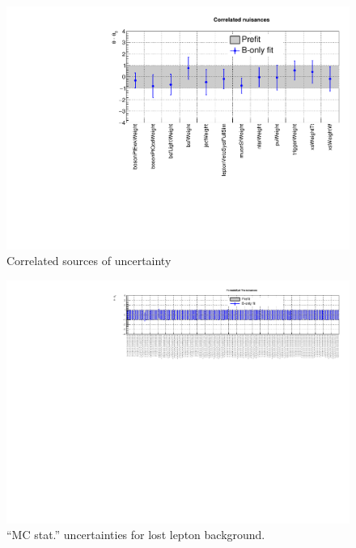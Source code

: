 \begin{figure}[h!]
  \centering
  \caption{Correlated sources of uncertainty}
  \includegraphics[width=1.\linewidth]{figures/results/36invfb_approval/postfit/nuis/Correlated_nuisances}
\end{figure}

\clearpage
\begin{figure}[h!]
  \centering
  \caption{``MC stat.'' uncertainties for lost lepton background.}
  \includegraphics[width=1.\linewidth]{figures/results/36invfb_approval/postfit/nuis/FormulaSystTtw_nuisances}
\end{figure}

